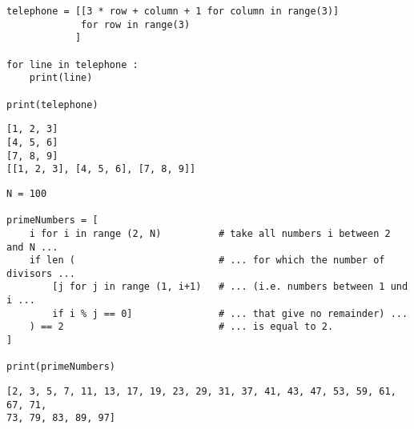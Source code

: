 
\begin{frame}[fragile]
%
\begin{codebox}
\begin{verbatim}
telephone = [[3 * row + column + 1 for column in range(3)]
             for row in range(3)
            ]

for line in telephone :
    print(line)

print(telephone)
\end{verbatim}
\end{codebox}
%
\begin{cmdbox}
\begin{verbatim}
[1, 2, 3]
[4, 5, 6]
[7, 8, 9]
[[1, 2, 3], [4, 5, 6], [7, 8, 9]]
\end{verbatim}
\end{cmdbox}
%
\end{frame}


\begin{frame}[fragile]
%
\begin{codebox}
\begin{verbatim}
N = 100

primeNumbers = [
    i for i in range (2, N)          # take all numbers i between 2 and N ...
    if len (                         # ... for which the number of divisors ...
        [j for j in range (1, i+1)   # ... (i.e. numbers between 1 und i ...
        if i % j == 0]               # ... that give no remainder) ...
    ) == 2                           # ... is equal to 2.
]

print(primeNumbers)

\end{verbatim}
\end{codebox}
%
\begin{cmdbox}
\begin{verbatim}
[2, 3, 5, 7, 11, 13, 17, 19, 23, 29, 31, 37, 41, 43, 47, 53, 59, 61, 67, 71,
73, 79, 83, 89, 97]
\end{verbatim}
\end{cmdbox}
%
\end{frame}